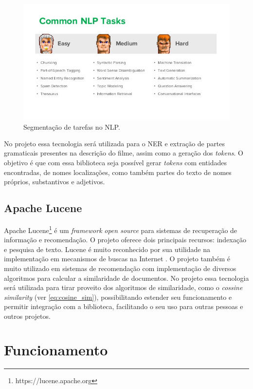 \begin{figure}
	\centering
	\includegraphics[scale=0.60]{imagens/nlp.jpg}
	\caption{Segmentação de tarefas no NLP. \citep{NLP2016}}
	\label{fig:nlp}
\end{figure}

No projeto essa tecnologia será utilizada para o \ac{NER} e extração de partes gramaticais presentes na descrição do filme, assim como a geração dos \textit{tokens}. O objetivo é que com essa biblioteca seja possível gerar \textit{tokens} com entidades encontradas, de nomes localizações, como também partes do texto de nomes próprios, substantivos e adjetivos.

\subsection{Apache Lucene}

Apache Lucene\footnote{https://lucene.apache.org} é um \textit{framework} \textit{open source} para sistemas de recuperação de informação e recomendação. O projeto oferece dois principais recursos: indexação e pesquisa de texto. Lucene é muito reconhecido por sua utilidade na implementação em mecanismos de buscas na Internet \citep{McCandless2010}. O projeto também é muito utilizado em sistemas de recomendação com implementação de diversos algoritmos para calcular a similaridade de documentos.
No projeto essa tecnologia será utilizada para tirar proveito dos algoritmos de similaridade, como o \textit{cossine similarity} (ver \ref{eq:cosine_sim}), possibilitando estender seu funcionamento e permitir integração com a biblioteca, facilitando o seu uso para outras pessoas e outros projetos.

\section{Funcionamento}

